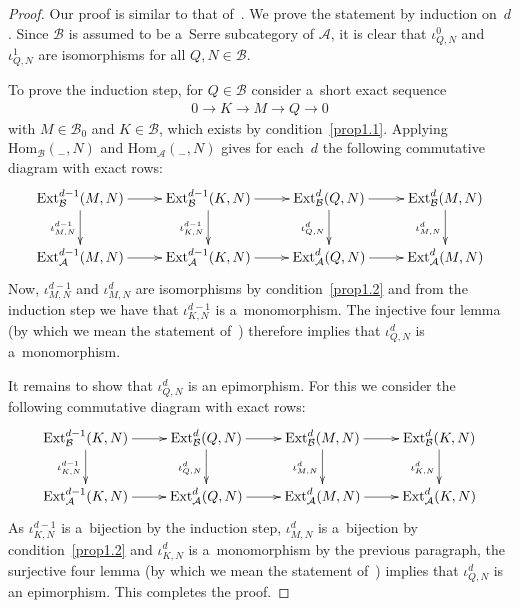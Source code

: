 \documentclass[11pt]{article}
\begin{document}
\begin{proof}
Our proof is similar to that of~\cite[Lemma~4]{CoMa}.
We prove the statement by induction on~$d$.
Since $\mathcal{B}$ is assumed to be a~Serre subcategory of $\mathcal{A}$, it is clear that $\iota^0_{Q,N}$ and
$\iota^1_{Q,N}$ are isomorphisms for all $Q,N\in\mathcal{B}$.

To prove the induction step, for $Q\in\mathcal{B}$ consider a~short exact sequence
\begin{gather*}
0\to K\to M\to Q\to 0
\end{gather*}
with $M\in\mathcal{B}_0$ and $K\in\mathcal{B}$, which exists by condition~\eqref{prop1.1}.
Applying $\mathrm{Hom}_{\mathcal{B}}({}_-,N)$ and $\mathrm{Hom}_{\mathcal{A}}({}_-,N)$ gives for each~$d$ the following
commutative diagram with exact rows:
\begin{gather*}
\xymatrix{
\mathrm{Ext}^{d-1}_{\mathcal{B}}(M,N)\ar[r]\ar[d]_{\iota^{d-1}_{M,N}}
&\mathrm{Ext}^{d-1}_{\mathcal{B}}(K,N)\ar[r]\ar[d]_{\iota^{d-1}_{K,N}}
&\mathrm{Ext}^d_{\mathcal{B}}(Q,N)\ar[r]\ar[d]_{\iota^d_{Q,N}}
& \mathrm{Ext}^d_{\mathcal{B}}(M,N)\ar[d]_{\iota^d_{M,N}}\\
\mathrm{Ext}^{d-1}_{\mathcal{A}}(M,N)\ar[r]&\mathrm{Ext}^{d-1}_{\mathcal{A}}(K,N)\ar[r]
&\mathrm{Ext}^d_{\mathcal{A}}(Q,N)\ar[r]& \mathrm{Ext}^d_{\mathcal{A}}(M,N)
}
\end{gather*}
Now, $\iota^{d-1}_{M,N}$ and $\iota^d_{M,N}$ are isomorphisms by condition~\eqref{prop1.2} and from the induction step
we have that $\iota^{d-1}_{K,N}$ is a~monomorphism.
The injective four lemma (by which we mean the statement of~\cite[Lemma~I.3.3(i)]{Mc}) therefore implies that
$\iota^d_{Q,N}$ is a~monomorphism.

It remains to show that $\iota^d_{Q,N}$ is an epimorphism.
For this we consider the following commutative diagram with exact rows:
\begin{gather*}
\xymatrix{
\mathrm{Ext}^{d-1}_{\mathcal{B}}(K,N)\ar[r]\ar[d]_{\iota^{d-1}_{K,N}}
&\mathrm{Ext}^{d}_{\mathcal{B}}(Q,N)\ar[r]\ar[d]_{\iota^{d}_{Q,N}}
&\mathrm{Ext}^d_{\mathcal{B}}(M,N)\ar[r]\ar[d]_{\iota^d_{M,N}}
& \mathrm{Ext}^d_{\mathcal{B}}(K,N)\ar[d]_{\iota^d_{K,N}}\\
\mathrm{Ext}^{d-1}_{\mathcal{A}}(K,N)\ar[r]&\mathrm{Ext}^{d}_{\mathcal{A}}(Q,N)\ar[r]
&\mathrm{Ext}^d_{\mathcal{A}}(M,N)\ar[r]& \mathrm{Ext}^d_{\mathcal{A}}(K,N)
}
\end{gather*}
As $\iota^{d-1}_{K,N}$ is a~bijection by the induction step, $\iota^d_{M,N}$ is a~bijection by condition~\eqref{prop1.2}
and $\iota^d_{K,N}$ is a~monomorphism by the previous paragraph, the surjective four lemma (by which we mean the
statement of~\cite[Lemma~I.3.3(ii)]{Mc}) implies that $\iota^d_{Q,N}$ is an epimorphism.
This completes the proof.
\end{proof}
\setcounter{section}{2}
\setcounter{subsection}{3}
\setcounter{subsubsection}{0}
\setcounter{innercustomthm}{0}
\setcounter{equation}{2}
\setcounter{proposition}{3}
\end{document}

